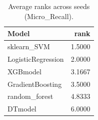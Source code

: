 \begin{table}[t]
\centering
\begin{tabular}{lr}
\toprule
Model & rank \\
\midrule
sklearn_SVM & 1.5000 \\
LogisticRegression & 2.0000 \\
XGBmodel & 3.1667 \\
GradientBoosting & 3.5000 \\
random_forest & 4.8333 \\
DTmodel & 6.0000 \\
\bottomrule
\end{tabular}
\caption{Average ranks across seeds (Micro_Recall).}
\label{tab:avg_rank_Micro_Recall}
\end{table}